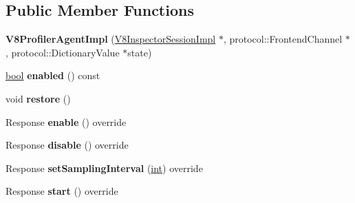 \subsection*{Public Member Functions}
\begin{DoxyCompactItemize}
\item 
\mbox{\label{classv8__inspector_1_1V8ProfilerAgentImpl_a8d2941790148ce0020d4c25b6b9c3214}} 
{\bfseries V8\+Profiler\+Agent\+Impl} (\mbox{\hyperlink{classv8__inspector_1_1V8InspectorSessionImpl}{V8\+Inspector\+Session\+Impl}} $\ast$, protocol\+::\+Frontend\+Channel $\ast$, protocol\+::\+Dictionary\+Value $\ast$state)
\item 
\mbox{\label{classv8__inspector_1_1V8ProfilerAgentImpl_a8d57db13de2252ddabca468d71755a49}} 
\mbox{\hyperlink{classbool}{bool}} {\bfseries enabled} () const
\item 
\mbox{\label{classv8__inspector_1_1V8ProfilerAgentImpl_a1fa8bf4be865f165f8c09275ae4842f0}} 
void {\bfseries restore} ()
\item 
\mbox{\label{classv8__inspector_1_1V8ProfilerAgentImpl_ad71baebb14c42d7d232d1d492ee1af5d}} 
Response {\bfseries enable} () override
\item 
\mbox{\label{classv8__inspector_1_1V8ProfilerAgentImpl_ac7ca2f249c34c46cbe0685255a4a4bee}} 
Response {\bfseries disable} () override
\item 
\mbox{\label{classv8__inspector_1_1V8ProfilerAgentImpl_ab05c748e7b7027641e38bb054f6baca7}} 
Response {\bfseries set\+Sampling\+Interval} (\mbox{\hyperlink{classint}{int}}) override
\item 
\mbox{\label{classv8__inspector_1_1V8ProfilerAgentImpl_a48f1b392afef578cbae079f57c8bde22}} 
Response {\bfseries start} () override
\item 
\mbox{\label{classv8__inspector_1_1V8ProfilerAgentImpl_ae7f8170a85ec4473170b65fa572f98a8}} 

\end{DoxyCompactItemize}
